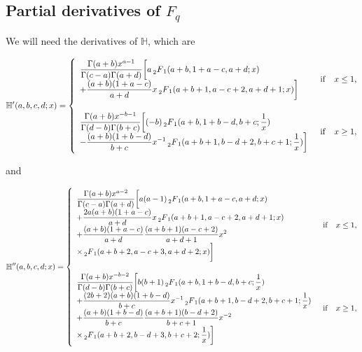 \documentclass[11pt]{article}
\newcommand{\Fq}{F_{q}}
\newcommand{\mH}{\mathbb{H}}
\newcommand{\HG}{\prescript{}{2}F_{1}}
\begin{document}
\begin{appendices}
\section{Partial derivatives of $\Fq$}
\label{app:Fq_derivatives}
We will need the derivatives of $\mH$, which are


\begin{equation}
  \mH'(a,b,c,d;x)=\begin{cases}
  \begin{array}{l}
    \displaystyle{\frac{\Gamma(a+b)x^{a-1}}{\Gamma(c-a)\Gamma(a+d)}\bigg[a\HG(a+b,1+a-c,a+d;x)} \\
      \displaystyle{+\frac{(a+b)(1+a-c)}{a+d}x \HG(a+b+1,a-c+2,a+d+1;x)\bigg]}
  \end{array} & {\rm{if}} \quad x\leq1 , \\
  {}&{}\\
  \begin{array}{l}
    \displaystyle{\frac{\Gamma(a+b)x^{-b-1}}{\Gamma(d-b)\Gamma(b+c)}\bigg[(-b)\HG(a+b,1+b-d,b+c;\frac{1}{x})} \\
      \displaystyle{-\frac{(a+b)(1+b-d)}{b+c}x^{-1}\HG(a+b+1,b-d+2,b+c+1;\frac{1}{x})\bigg]}
    \end{array} &{\rm{if}} \quad x\geq1 ,
\end{cases}
\label{eq:dHdx}
\end{equation}

and

\begin{equation}
  \mH''(a,b,c,d;x)=\begin{cases}
  \begin{array}{l}
    \displaystyle{\frac{\Gamma(a+b)x^{a-2}}{\Gamma(c-a)\Gamma(a+d)}\bigg[a(a-1)\HG(a+b,1+a-c,a+d;x)} \\
        \displaystyle{+\frac{2a(a+b)(1+a-c)}{a+d}x\HG(a+b+1,a-c+2,a+d+1;x)}\\
        \displaystyle{+\frac{(a+b)(1+a-c)}{a+d}\frac{(a+b+1)(a-c+2)}{a+d+1}x^{2}} \\
        \displaystyle{\times \HG(a+b+2,a-c+3,a+d+2;x)\bigg]}
  \end{array} & {\rm{if}} \quad x\leq1 , \\
  {}&{}\\
  \begin{array}{l}
    \displaystyle{\frac{\Gamma(a+b)x^{-b-2}}{\Gamma(d-b)\Gamma(b+c)}\bigg[b(b+1)\HG(a+b,1+b-d,b+c;\frac{1}{x})} \\
      \displaystyle{+\frac{(2b+2)(a+b)(1+b-d)}{b+c}x^{-1}\HG(a+b+1,b-d+2,b+c+1;\frac{1}{x})}\\
      \displaystyle{+\frac{(a+b)(1+b-d)}{b+c}\frac{(a+b+1)(b-d+2)}{b+c+1}x^{-2}} \\
      \displaystyle{\times \HG(a+b+2,b-d+3,b+c+2;\frac{1}{x})\bigg]}
    \end{array} &{\rm{if}} \quad x\geq1 ,
\end{cases}
\label{eq:d2Hdx2}
\end{equation}


\end{appendices}
\end{document}
